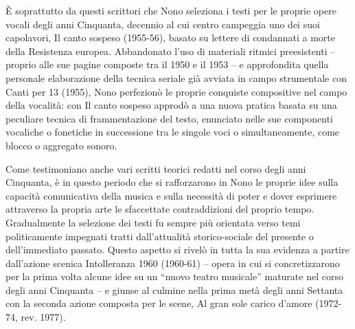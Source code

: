 È soprattutto da questi scrittori che Nono seleziona i testi per le proprie opere vocali degli anni Cinquanta, decennio al cui centro campeggia uno dei suoi capolavori, Il canto sospeso (1955-56), basato su lettere di condannati a morte della Resistenza europea. Abbandonato l’uso di materiali ritmici preesistenti – proprio alle sue pagine composte tra il 1950 e il 1953 – e approfondita quella personale elaborazione della tecnica seriale già avviata in campo strumentale con Canti per 13 (1955), Nono perfezionò le proprie conquiste compositive nel campo della vocalità: con Il canto sospeso approdò a una nuova pratica basata su una peculiare tecnica di frammentazione del testo, enunciato nelle sue componenti vocaliche o fonetiche in successione tra le singole voci o simultaneamente, come blocco o aggregato sonoro.

Come testimoniano anche vari scritti teorici redatti nel corso degli anni Cinquanta, è in questo periodo che si rafforzarono in Nono le proprie idee sulla capacità comunicativa della musica e sulla necessità di poter e dover esprimere attraverso la propria arte le sfaccettate contraddizioni del proprio tempo. Gradualmente la selezione dei testi fu sempre più orientata verso temi politicamente impegnati tratti dall’attualità storico-sociale del presente o dell’immediato passato. Questo aspetto si rivelò in tutta la sua evidenza a partire dall’azione scenica Intolleranza 1960 (1960-61) – opera in cui si concretizzarono per la prima volta alcune idee su un “nuovo teatro musicale” maturate nel corso degli anni Cinquanta – e giunse al culmine nella prima metà degli anni Settanta con la seconda azione composta per le scene, Al gran sole carico d’amore (1972-74, rev. 1977).

